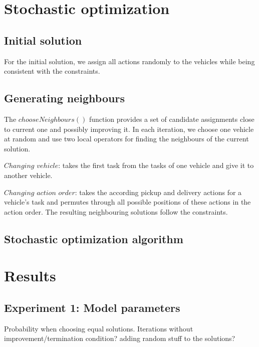 \documentclass[11pt]{article}
\begin{document}
\section{Stochastic optimization}

\subsection{Initial solution}
For the initial solution, we assign all actions randomly to the vehicles while being consistent with the constraints. 

\subsection{Generating neighbours}
The $chooseNeighbours()$ function provides a set of candidate assignments close to current one and possibly improving it. 
In each iteration, we choose one vehicle at random and use two local operators for ﬁnding the neighbours of the current solution.
\begin{description}
	\item $Changing$ $vehicle$: takes the ﬁrst task from the tasks of one vehicle and give it to another vehicle.

	\item $Changing$ $action$ $order$: takes the according pickup and delivery actions for a vehicle's task and permutes through all possible positions of these actions in the action order. The resulting neighbouring solutions follow the constraints.
\end {description}

\subsection{Stochastic optimization algorithm}


\section{Results}

\subsection{Experiment 1: Model parameters}
Probability when choosing equal solutions.
Iterations without improvement/termination condition?
adding random stuff to the solutions?
\end{document}
